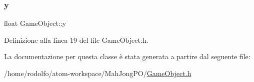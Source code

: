 \subsubsection{\texorpdfstring{y}{y}}
{\footnotesize\ttfamily float Game\+Object\+::y\hspace{0.3cm}{\ttfamily [protected]}}



Definizione alla linea 19 del file Game\+Object.\+h.



La documentazione per questa classe è stata generata a partire dal seguente file\+:\begin{DoxyCompactItemize}
\item 
/home/rodolfo/atom-\/workspace/\+Mah\+Jong\+P\+O/\hyperlink{_game_object_8h}{Game\+Object.\+h}\end{DoxyCompactItemize}
